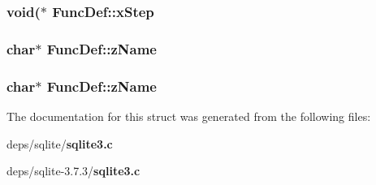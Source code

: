 \subsubsection{\setlength{\rightskip}{0pt plus 5cm}void($\ast$ \bf{Func\-Def::x\-Step}}\label{structFuncDef_2c71f8f942ad7731a66299bea21632a0}


\subsubsection{\setlength{\rightskip}{0pt plus 5cm}char$\ast$ \bf{Func\-Def::z\-Name}}\label{structFuncDef_7155e4e22ecfa69703f3e4e421836073}


\subsubsection{\setlength{\rightskip}{0pt plus 5cm}char$\ast$ \bf{Func\-Def::z\-Name}}\label{structFuncDef_7155e4e22ecfa69703f3e4e421836073}




The documentation for this struct was generated from the following files:\begin{CompactItemize}
\item 
deps/sqlite/\bf{sqlite3.c}\item 
deps/sqlite-3.7.3/\bf{sqlite3.c}\end{CompactItemize}
